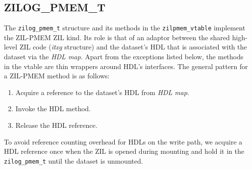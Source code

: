 \documentclass[12pt,a4paper,twoside]{book}
\begin{document}
\subsection{ZILOG\_PMEM\_T}\label{sec:zilpmem:zilog}
The \lstinline{zilog_pmem_t} structure and its methods in the \lstinline{zilpmem_vtable} implement the ZIL-PMEM ZIL kind.
Its role is that of an adaptor between the shared high-level ZIL code (\textit{itxg} structure) and the dataset's HDL that is associated with the dataset via the \textit{HDL map}.
Apart from the exceptions listed below, the methods in the vtable are thin wrappers around HDL's interfaces.
The general pattern for a ZIL-PMEM method is as follows:
\begin{enumerate}[noitemsep]
    \item Acquire a reference to the dataset's HDL from \textit{HDL map}.
    \item Invoke the HDL method.
    \item Release the HDL reference.
\end{enumerate}
To avoid reference counting overhead for HDLs on the write path, we acquire a HDL reference once when the ZIL is opened during mounting and hold it in the \lstinline{zilog_pmem_t} until the dataset is unmounted.
\end{document}
